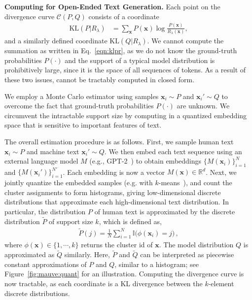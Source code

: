 \documentclass{article}
\newcommand{\myparagraph}[1]{\par\noindent\textbf{{#1}.}} %
\newcommand \Ccal {\mathcal C}
\newcommand \xv {\bm{x}}
\theoremstyle{definition}
\newcommand{\kl}{{\mathrm{KL}}}
\newcommand \reals {\mathbb{R}}
\newcommand{\name}{{\fontfamily{bch}\selectfont{\textsc{Mauve}}}\xspace}
\begin{document}
\myparagraph{Computing \name for Open-Ended Text Generation}
%
%
%
Each point on the divergence curve $\Ccal(P, Q)$ consists of a coordinate
\begin{align}\label{eqn:klpr}
    \kl(P|R_\lambda) &= \sum_{\xv}P(\xv)\log\frac{P(\xv)}{R_\lambda(\xv)}, 
\end{align}
and a similarly defined coordinate $\kl(Q|R_\lambda)$. 
We cannot compute the summation as written in Eq.~\eqref{eqn:klpr}, as we do not know the ground-truth probabilities $P(\cdot)$
and the support of a typical model distribution is prohibitively large, since it is the space of all sequences of tokens.
As a result of these two issues, \name cannot be tractably computed in closed form. 

We employ a Monte Carlo estimator using samples $\xv_i\sim P$ and $\xv_i'\sim Q$ to overcome the fact that ground-truth probabilities $P(\cdot)$ are unknown.
We circumvent the intractable support size by computing \name in a quantized embedding space that is sensitive to important features of text.
 
%
%
The overall estimation procedure is as follows.
First, we sample human text $\xv_i \sim P$ and machine text $\xv_i'\sim Q$. We then embed each text sequence using an external language model $M$ (e.g., GPT-2~\citep{radford2019language}) to obtain embeddings $\{M(\xv_i)\}_{i=1}^N$  and $\{M(\xv_i')\}_{i=1}^{N'}$. 
Each embedding is now a vector $M(\xv)\in \reals^d$.
%
%
Next, we jointly quantize the embedded samples (e.g. with $k$-means~\cite{manning2001foundations}), and count the cluster assignments to form histograms, giving low-dimensional discrete distributions that approximate each high-dimensional text distribution.
In particular, the distribution $P$ of human text is approximated by the discrete distribution $\tilde P$ of support size $k$, which is defined as,
\begin{align}
\label{eqn:approx}
    \tilde{P}(j)=\frac{1}{N} \sum_{i=1}^N \mathbb{I}\big(\phi(\xv_i) = j \big) \,,
\end{align}
where $\phi(\xv)\in\{1,\cdots,k\}$ returns the cluster id of $\xv$.
%
The model distribution $Q$ is approximated as $\tilde Q$ similarly.
Here, $\tilde P$ and $\tilde Q$ can be interpreted as piecewise constant approximations of $P$ and $Q$, similar to a histogram; see Figure~\ref{fig:mauve:quant}
for an illustration. 
%
Computing the divergence curve is now tractable, as each coordinate is a KL divergence between the $k$-element discrete distributions. 
%
\end{document}
